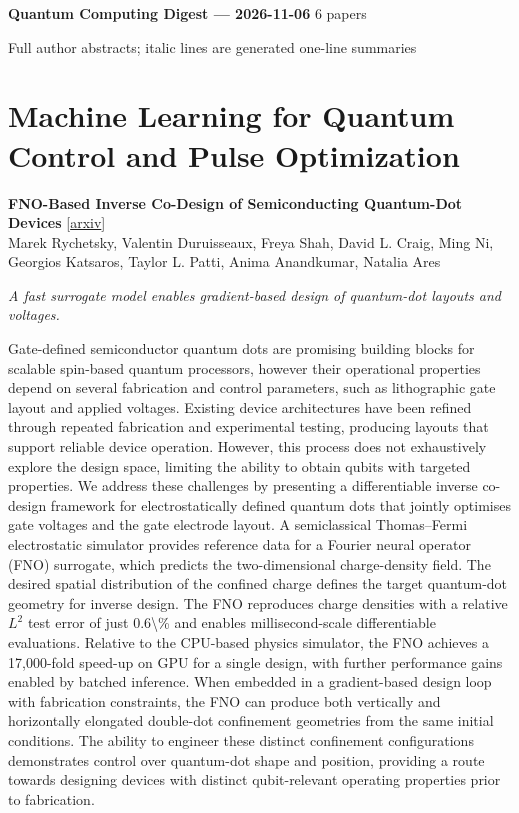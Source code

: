 \documentclass[12pt,letterpaper]{article}
\begin{document}
{\footnotesize\textbf{Quantum Computing Digest --- 2026-11-06} \hfill 6 papers}

{\scriptsize Full author abstracts; italic lines are generated one-line summaries}
\section*{Machine Learning for Quantum Control and Pulse Optimization}
{\small\textbf{FNO-Based Inverse Co-Design of Semiconducting Quantum-Dot Devices}} {\scriptsize[\href{https://arxiv.org/abs/2611.06994}{arxiv}]}\nopagebreak\\
{\scriptsize Marek Rychetsky, Valentin Duruisseaux, Freya Shah, David L. Craig, Ming Ni, Georgios Katsaros, Taylor L. Patti, Anima Anandkumar, Natalia Ares}\nopagebreak\\[2pt]
{\footnotesize\textit{A fast surrogate model enables gradient-based design of quantum-dot layouts and voltages.}\par}\nopagebreak
{\footnotesize Gate-defined semiconductor quantum dots are promising building blocks for scalable spin-based quantum processors, however their operational properties depend on several fabrication and control parameters, such as lithographic gate layout and applied voltages. Existing device architectures have been refined through repeated fabrication and experimental testing, producing layouts that support reliable device operation. However, this process does not exhaustively explore the design space, limiting the ability to obtain qubits with targeted properties. We address these challenges by presenting a differentiable inverse co-design framework for electrostatically defined quantum dots that jointly optimises gate voltages and the gate electrode layout. A semiclassical Thomas--Fermi electrostatic simulator provides reference data for a Fourier neural operator (FNO) surrogate, which predicts the two-dimensional charge-density field. The desired spatial distribution of the confined charge defines the target quantum-dot geometry for inverse design. The FNO reproduces charge densities with a relative $L^2$ test error of just 0.6\textbackslash{}\% and enables millisecond-scale differentiable evaluations. Relative to the CPU-based physics simulator, the FNO achieves a 17,000-fold speed-up on GPU for a single design, with further performance gains enabled by batched inference. When embedded in a gradient-based design loop with fabrication constraints, the FNO can produce both vertically and horizontally elongated double-dot confinement geometries from the same initial conditions. The ability to engineer these distinct confinement configurations demonstrates control over quantum-dot shape and position, providing a route towards designing devices with distinct qubit-relevant operating properties prior to fabrication.\par}
\medskip
\end{document}
